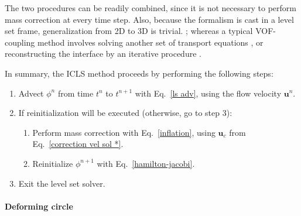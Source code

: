  The two procedures can be readily combined, since it is not necessary to perform mass correction at every time step. Also, because the formalism is cast in a level set frame, generalization from 2D to 3D is trivial. ; whereas a typical VOF-coupling method involves solving another set of transport equations \citep{Sussman_JCP_2000}, or reconstructing the interface by an iterative procedure \citep{Luo_JCP_2015}.

In summary, the ICLS method proceeds by performing the following steps:

\begin{enumerate}
    \item Advect $\phi^{n}$ from time $t^{n}$ to $t^{n+1}$ with Eq.\ \eqref{ls adv}, using the flow velocity ${\bm u}^{n}$.
    
    \item If reinitialization will be executed (otherwise, go to step 3):
      \begin{enumerate}
        \item Perform mass correction with Eq.\ \eqref{inflation}, using ${\bm u}_c$ from Eq.\ \eqref{correction vel sol *}.
        \item Reinitialize $\phi^{n+1}$ with Eq.\ \eqref{hamilton-jacobi}.
      \end{enumerate}
    
    \item Exit the level set solver.
\end{enumerate}


\paragraph {Deforming circle}

